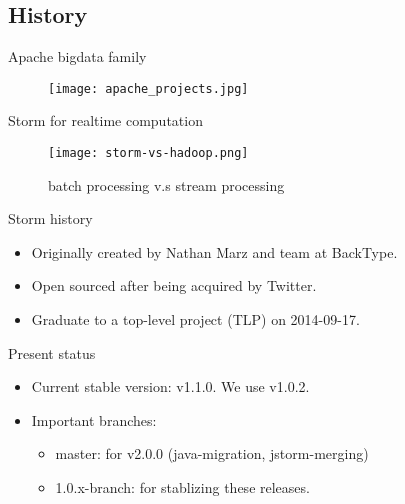\documentclass{beamer}
\begin{document}
\subsection{History}
\begin{frame}{Apache bigdata family}
  \begin{figure}
    \centering
    \texttt{[image: apache\_projects.jpg]}
  \end{figure}
\end{frame}
\begin{frame}{Storm for realtime computation}
  \begin{figure}
    \centering
    \texttt{[image: storm-vs-hadoop.png]}
    \caption{batch processing v.s stream processing}
  \end{figure}
\end{frame}
\begin{frame}{Storm history}
  \begin{itemize}
    \item Originally created by Nathan Marz and team at BackType.
    \item Open sourced after being acquired by Twitter.
    \item Graduate to a top-level project (TLP) on 2014-09-17.
  \end{itemize}
\end{frame}
\begin{frame}{Present status}
  \begin{itemize}
    \item Current stable version: v1.1.0. We use v1.0.2.
    \item Important branches:
      \begin{itemize}
	\item master: for v2.0.0 (java-migration, jstorm-merging)
	\item 1.0.x-branch: for stablizing these releases.
      \end{itemize}
  \end{itemize}
\end{frame}
\end{document}
